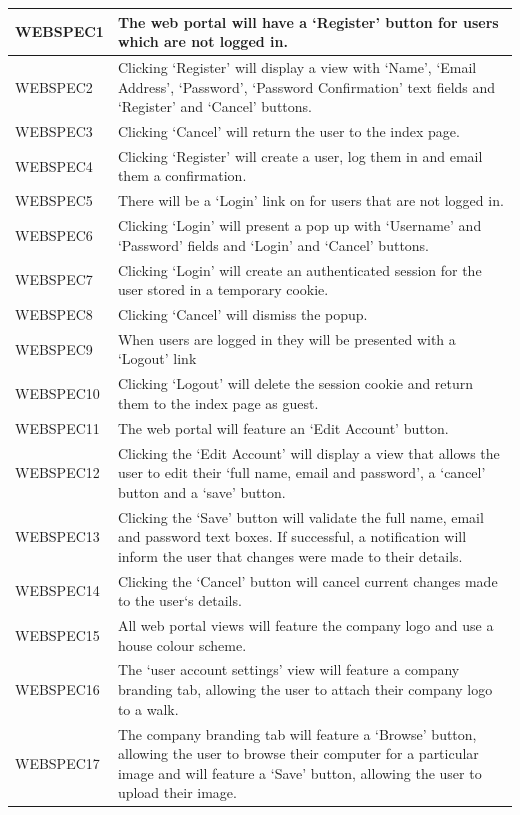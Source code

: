 \documentclass[11pt,a4paper]{article}
\begin{document}
\begin{longtable}{|p{2.5cm}p{13cm}|}
\hline
WEBSPEC1 & The web portal will have a `Register' button for users which are not logged in. \\ \hline
WEBSPEC2 & Clicking `Register' will display a view with `Name', `Email Address', `Password', `Password Confirmation' text fields and `Register' and `Cancel' buttons.\\ \hline
WEBSPEC3 & Clicking `Cancel' will return the user to the index page.\\ \hline
WEBSPEC4 & Clicking `Register' will create a user, log them in and email them a confirmation. \\ \hline
WEBSPEC5 & There will be a `Login' link on for users that are not logged in.\\ \hline
WEBSPEC6 & Clicking `Login' will present a pop up with `Username' and `Password' fields and `Login' and `Cancel' buttons. \\ \hline
WEBSPEC7 & Clicking `Login' will create an authenticated session for the user stored in a temporary cookie.\\ \hline
WEBSPEC8 & Clicking `Cancel' will dismiss the popup. \\ \hline
WEBSPEC9 & When users are logged in they will be presented with a `Logout' link\\ \hline
WEBSPEC10 & Clicking `Logout' will delete the session cookie and return them to the index page as guest. \\ \hline
WEBSPEC11 & The web portal will feature an `Edit Account' button. \\ \hline
WEBSPEC12 & Clicking the `Edit Account' will display a view that allows the user to edit their `full name, email and password', a `cancel' button and a `save' button. \\ \hline
WEBSPEC13 & Clicking the `Save' button will validate the full name, email and password text boxes. If successful, a notification will inform the user that changes were made to their details. \\ \hline
WEBSPEC14 & Clicking the `Cancel' button will cancel current changes made to the user`s details. \\ \hline
WEBSPEC15 & All web portal views will feature the company logo and use a house colour scheme. \\ \hline
WEBSPEC16 & The `user account settings' view will feature a company branding tab, allowing the user to attach their company logo to a walk. \\ \hline
WEBSPEC17 & The company branding tab will feature a `Browse' button, allowing the user to browse their computer for a particular image and will feature a `Save' button, allowing the user to upload their image. \\ \hline

\end{longtable}
\end{document}
